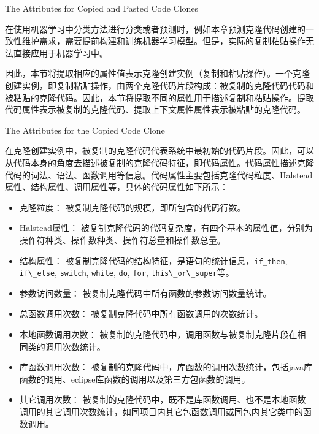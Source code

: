 {The Attributes for Copied and Pasted Code Clones}
\label{lab-creatingattribute}

在使用机器学习中分类方法进行分类或者预测时，例如本章预测克隆代码创建的一致性维护需求，需要提前构建和训练机器学习模型。但是，实际的复制粘贴操作无法直接应用于机器学习中。

因此，本节将提取相应的属性值表示克隆创建实例（复制和粘贴操作）。一个克隆创建实例，即复制粘贴操作，由两个克隆代码片段构成：被复制的克隆代码代码和被粘贴的克隆代码。因此，本节将提取不同的属性用于描述复制和粘贴操作。提取代码属性表示被复制的克隆代码、提取上下文属性属性表示被粘贴的克隆代码。

{The Attributes for the Copied Code Clone}

在克隆创建实例中，被复制的克隆代码代表系统中最初始的代码片段。因此，可以从代码本身的角度去描述被复制的克隆代码特征，即代码属性。代码属性描述克隆代码的词法、语法、函数调用等信息。代码属性主要包括克隆代码粒度、Halstead属性、结构属性、调用属性等，具体的代码属性如下所示：

\begin{itemize}
\item 
克隆粒度：
被复制克隆代码的规模，即所包含的代码行数。
\item 
Halstead属性：
被复制克隆代码的代码复杂度，有四个基本的属性值，分别为操作符种类、操作数种类、操作符总量和操作数总量。
\item  
结构属性：
被复制克隆代码的结构特征，是语句的统计信息，\verb+if_then+, \verb+if\_else+, \verb+switch+, \verb+while+, \verb+do+, \verb+for+,  \verb+this\_or\_super+等。
\item  
参数访问数量：
被复制克隆代码中所有函数的参数访问数量统计。
\item  
总函数调用次数：
被复制克隆代码中所有函数调用的次数统计。
\item  
本地函数调用次数：
被复制的克隆代码中，调用函数与被复制克隆片段在相同类的调用次数统计。
\item  
库函数调用次数：
被复制的克隆代码中，库函数的调用次数统计，包括java库函数的调用、eclipse库函数的调用以及第三方包函数的调用。
\item  
其它调用次数：
被复制的克隆代码中，既不是库函数调用、也不是本地函数调用的其它调用次数统计，如同项目内其它包函数调用或同包内其它类中的函数调用。
\end{itemize}

